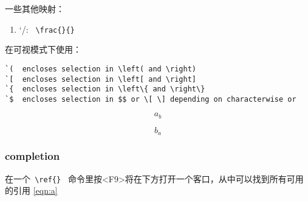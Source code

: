\documentclass[UTF8]{ctexart}
\begin{document}
一些其他映射：
\begin{enumerate}
    \item `/: \verb" \frac{}{} "
\end{enumerate}
在可视模式下使用：

\begin{verbatim}
`(  encloses selection in \left( and \right)
`[  encloses selection in \left[ and \right]
`{  encloses selection in \left\{ and \right\}
`$  encloses selection in $$ or \[ \] depending on characterwise or
\end{verbatim}

\begin{equation}
    a_b
    \label{eqn:a}
\end{equation}

\begin{equation}
    b_a
    \label{eqn:b}
\end{equation}

\subsubsection{completion}
在一个\verb" \ref{} " 命令里按<F9>将在下方打开一个客口，从中可以找到所有可用的引用
\ref{eqn:a}
\end{document}
